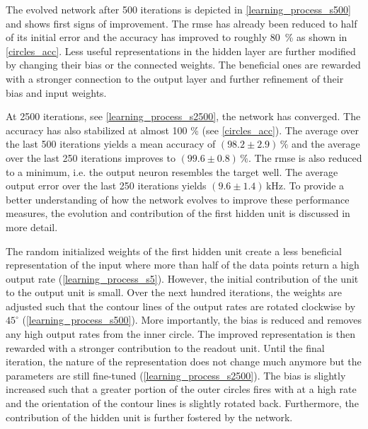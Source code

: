 %	

The evolved network after 500 iterations is depicted in \cref{learning_process_s500} and shows first signs of improvement. The \gls{rmse} has already been reduced to half of its initial error and the accuracy has improved to roughly \SI{80}{\%} as shown in \cref{circles_acc}. Less useful representations in the hidden layer are further modified by changing their bias or the connected weights. The beneficial ones are rewarded with a stronger connection to the output layer and further refinement of their bias and input weights.

At 2500 iterations, see \cref{learning_process_s2500}, the network has converged. The accuracy has also stabilized at almost 100 \% (see \cref{circles_acc}). The average over the last 500 iterations yields a mean accuracy of $(98.2 \pm 2.9)\,\%$ and the average over the last 250 iterations improves to  $(99.6 \pm 0.8)\,\%$. The \gls{rmse} is also reduced to a minimum, i.e. the output neuron resembles the target well. The average output error over the last 250 iterations yields $(9.6 \pm 1.4)\,\si{\kilo \Hz}$. To provide a better understanding of how the network evolves to improve these performance measures, the evolution and contribution of the first hidden unit is discussed in more detail.

The random initialized weights of the first hidden unit create a less beneficial representation of the input where more than half of the data points return a high output rate (\cref{learning_process_s5}). However, the initial contribution of the unit to the output unit is small. Over the next hundred iterations, the weights are adjusted such that the contour lines of the output rates are rotated clockwise by $45^\circ$ (\cref{learning_process_s500}). More importantly, the bias is reduced and removes any high output rates from the inner circle. The improved representation is then rewarded with a stronger contribution to the readout unit. Until the final iteration, the nature of the representation does not change much anymore but the parameters are still fine-tuned (\cref{learning_process_s2500}). The bias is slightly increased such that a greater portion of the outer circles fires with at a high rate and the orientation of the contour lines is slightly rotated back. Furthermore, the contribution of the hidden unit is further fostered by the network.


%    
